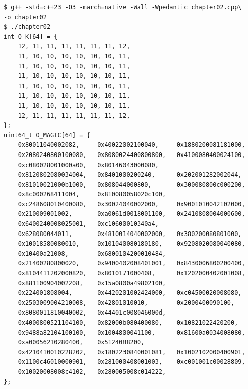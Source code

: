\documentclass[12pt,a4paper,twoside,openright]{book}
\begin{document}
\begin{mdframed}[skipabove=\baselineskip,skipbelow=0pt,hidealllines=true,backgroundcolor=black!3,innerleftmargin=10pt,innerrightmargin=5pt,innertopmargin=0pt,innerbottommargin=5pt]
\begin{verbatim}
$ g++ -std=c++23 -O3 -march=native -Wall -Wpedantic chapter02.cpp\
-o chapter02
$ ./chapter02
int O_K[64] = {
    12, 11, 11, 11, 11, 11, 11, 12,
    11, 10, 10, 10, 10, 10, 10, 11,
    11, 10, 10, 10, 10, 10, 10, 11,
    11, 10, 10, 10, 10, 10, 10, 11,
    11, 10, 10, 10, 10, 10, 10, 11,
    11, 10, 10, 10, 10, 10, 10, 11,
    11, 10, 10, 10, 10, 10, 10, 11,
    12, 11, 11, 11, 11, 11, 11, 12,
};
uint64_t O_MAGIC[64] = {
    0x80011040002082,     0x40022002100040,     0x1880200081181000,
    0x2080240800100080,   0x8080024400800800,   0x4100080400024100,
    0xc080028001000a00,   0x80146043000080,
    0x8120802080034004,   0x8401000200240,      0x202001282002044,
    0x81010021000b1000,   0x808044000800,       0x300080800c000200,
    0x8c000268411004,     0x810080058020c100,
    0xc248608010400080,   0x30024040002000,     0x9001010042102000,
    0x210009001002,       0xa0061d0018001100,   0x2410808004000600,
    0x6400240008025001,   0xc10600010340a4,
    0x628080044011,       0x4810014040002000,   0x380200080801000,
    0x10018580080010,     0x101040080180180,    0x9208020080040080,
    0x10400a21008,        0x6800104200010484,
    0x21400280800020,     0x9400402008401001,   0x8430006800200400,
    0x8104411202000820,   0x8010171000408,      0x1202000402001008,
    0x881100904002208,    0x15a0800a49802100,
    0x224001808004,       0x4420201002424000,   0xc04500020008080,
    0x2503009004210008,   0x42801010010,        0x2000400090100,
    0x8080011810040002,   0x44401c008046000d,
    0x4000800521104100,   0x82000b080400080,    0x10821022420200,
    0x9488a82104100100,   0x1004800041100,      0x81600a0034008080,
    0xa00056210280400,    0x5124088200,
    0x4210410010228202,   0x1802230840001081,   0x1002102000400901,
    0x1100c46010000901,   0x281000408001003,    0xc001001c00028809,
    0x10020008008c4102,   0x280005008c014222,
};


\end{verbatim}
\end{mdframed}
\end{document}
